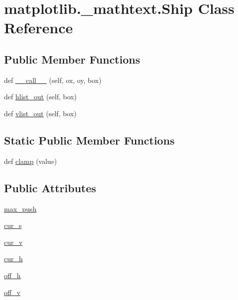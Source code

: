 \hypertarget{classmatplotlib_1_1__mathtext_1_1Ship}{}\section{matplotlib.\+\_\+mathtext.\+Ship Class Reference}
\label{classmatplotlib_1_1__mathtext_1_1Ship}
\subsection*{Public Member Functions}
\begin{DoxyCompactItemize}
\item 
def \hyperlink{classmatplotlib_1_1__mathtext_1_1Ship_add689aa1829478359ac56e36493db01a}{\+\_\+\+\_\+call\+\_\+\+\_\+} (self, ox, oy, box)
\item 
def \hyperlink{classmatplotlib_1_1__mathtext_1_1Ship_a14ae87f573e23ad0d753b22f515ccf36}{hlist\+\_\+out} (self, box)
\item 
def \hyperlink{classmatplotlib_1_1__mathtext_1_1Ship_a344387d7af078a53ae7e0f60e65ccfa1}{vlist\+\_\+out} (self, box)
\end{DoxyCompactItemize}
\subsection*{Static Public Member Functions}
\begin{DoxyCompactItemize}
\item 
def \hyperlink{classmatplotlib_1_1__mathtext_1_1Ship_a53454355065ac2443cf24429e8753390}{clamp} (value)
\end{DoxyCompactItemize}
\subsection*{Public Attributes}
\begin{DoxyCompactItemize}
\item 
\hyperlink{classmatplotlib_1_1__mathtext_1_1Ship_ad0d3a291c809db00cc0e4f2032e9b0fe}{max\+\_\+push}
\item 
\hyperlink{classmatplotlib_1_1__mathtext_1_1Ship_aeeb01621889222c8c938180d2be15b54}{cur\+\_\+s}
\item 
\hyperlink{classmatplotlib_1_1__mathtext_1_1Ship_a2af3dff86d577eb845bdd5ffd128a734}{cur\+\_\+v}
\item 
\hyperlink{classmatplotlib_1_1__mathtext_1_1Ship_a36108bf51e5f8e0c12781f9b9f0cddcf}{cur\+\_\+h}
\item 
\hyperlink{classmatplotlib_1_1__mathtext_1_1Ship_a151527dd71f22d7e0d308eba9759cc4e}{off\+\_\+h}
\item 
\hyperlink{classmatplotlib_1_1__mathtext_1_1Ship_a15dd6a262df58b74f0daf2377dce6b0b}{off\+\_\+v}
\end{DoxyCompactItemize}


